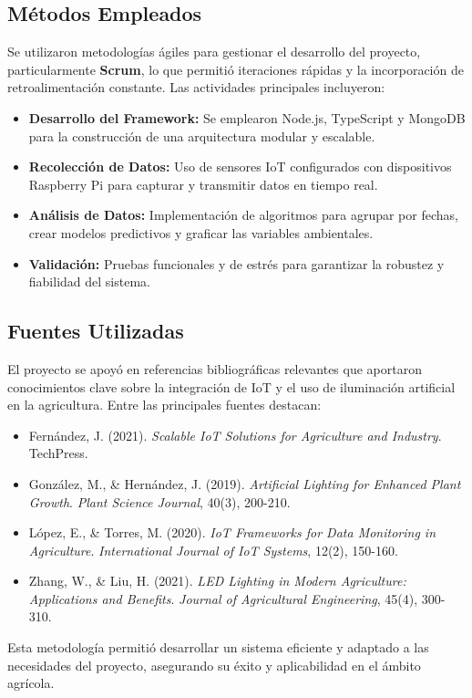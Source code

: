 \subsection{Métodos Empleados}
Se utilizaron metodologías ágiles para gestionar el desarrollo del proyecto, particularmente \textbf{Scrum}, lo que permitió iteraciones rápidas y la incorporación de retroalimentación constante. Las actividades principales incluyeron:
\begin{itemize}
    \item \textbf{Desarrollo del Framework:} Se emplearon Node.js, TypeScript y MongoDB para la construcción de una arquitectura modular y escalable.
    \item \textbf{Recolección de Datos:} Uso de sensores IoT configurados con dispositivos Raspberry Pi para capturar y transmitir datos en tiempo real.
    \item \textbf{Análisis de Datos:} Implementación de algoritmos para agrupar por fechas, crear modelos predictivos y graficar las variables ambientales.
    \item \textbf{Validación:} Pruebas funcionales y de estrés para garantizar la robustez y fiabilidad del sistema.
\end{itemize}

\subsection{Fuentes Utilizadas}
El proyecto se apoyó en referencias bibliográficas relevantes que aportaron conocimientos clave sobre la integración de IoT y el uso de iluminación artificial en la agricultura. Entre las principales fuentes destacan:
\begin{itemize}
    \item Fernández, J. (2021). \textit{Scalable IoT Solutions for Agriculture and Industry}. TechPress.
    \item González, M., \& Hernández, J. (2019). \textit{Artificial Lighting for Enhanced Plant Growth}. \textit{Plant Science Journal}, 40(3), 200-210.
    \item López, E., \& Torres, M. (2020). \textit{IoT Frameworks for Data Monitoring in Agriculture}. \textit{International Journal of IoT Systems}, 12(2), 150-160.
    \item Zhang, W., \& Liu, H. (2021). \textit{LED Lighting in Modern Agriculture: Applications and Benefits}. \textit{Journal of Agricultural Engineering}, 45(4), 300-310.
\end{itemize}

Esta metodología permitió desarrollar un sistema eficiente y adaptado a las necesidades del proyecto, asegurando su éxito y aplicabilidad en el ámbito agrícola.
